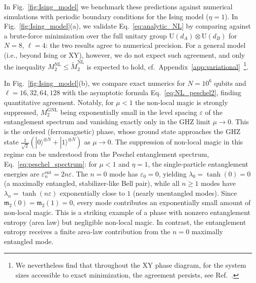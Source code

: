 \documentclass[prx,twocolumn,superscriptaddress,aps,10pt, frontmatterverbose, reprint,footinbib,longbibliography=true]{revtex4-2}
\begin{document}
In Fig.~\ref{fig:Ising_model} we benchmark these predictions against numerical simulations with periodic boundary conditions for the Ising model ($\eta=1$).
In Fig.~\ref{fig:Ising_model}(a), we validate Eq.~\eqref{eq:analytic_NL} by comparing against a brute-force minimization over the full unitary group $\mathrm{U}(d_A)\otimes\mathrm{U}(d_B)$ for $N=8$, $\ell=4$: the two results agree to numerical precision. For a general model (i.e., beyond Ising or XY), however, we do not expect such agreement, and only the inequality
$M_2^{\mathrm{NL}}\le \widetilde{M}_2^{\mathrm{NL}}$ is expected to hold,
cf.~Appendix~\ref{app:variational}~\footnote{We nevertheless find that throughout the XY phase
diagram, for the system sizes accessible to exact minimization, the agreement persists, see Ref.~\cite{zenodo}.}. 

In Fig.~\ref{fig:Ising_model}(b), we compare exact numerics for $N=10^6$ qubits and $\ell = 16,32,64,128$ with the asymptotic formula Eq.~\eqref{eq:NL_peschel2}, finding quantitative agreement. Notably, for $\mu<1$ the non-local magic is strongly suppressed, $M_2^{\mathrm{GNL}}$ being exponentially small in the level spacing $\varepsilon$ of the entanglement spectrum and vanishing exactly only in the GHZ limit $\mu\to0$. This is the ordered (ferromagnetic) phase, whose ground state approaches the GHZ state $\frac{1}{\sqrt{2}}(|0\rangle^{\otimes N}+|1\rangle^{\otimes N})$ as $\mu\to 0$. The suppression of non-local magic in this regime can be understood from the Peschel entanglement spectrum, Eq.~\eqref{eq:peschel_spectrum}: for $\mu<1$ and $\eta=1$, the single-particle entanglement energies are $\varepsilon_n^{\mathrm{ent}}=2n\varepsilon$. The $n=0$ mode has $\varepsilon_0=0$, yielding $\lambda_0=\tanh(0)=0$ (a maximally entangled, stabilizer-like Bell pair), while all $n\ge 1$ modes have $\lambda_n=\tanh(n\varepsilon)$ exponentially close to $1$ (nearly unentangled modes). Since $\mathfrak{m}_2(0)=\mathfrak{m}_2(1)=0$, every mode contributes an exponentially small amount of non-local magic. This is a striking example of a phase with nonzero entanglement entropy (area law) but negligible  non-local magic. In contrast, the entanglement entropy receives a finite area-law contribution from the $n=0$ maximally entangled mode.
\end{document}
